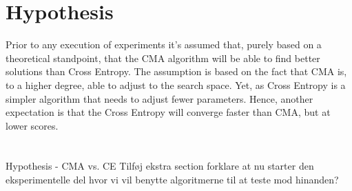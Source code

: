 \section{Hypothesis}

Prior to any execution of experiments it's assumed that, purely based 
on a theoretical standpoint, that the CMA algorithm will be able to 
find better solutions than Cross Entropy. The assumption is based 
on the fact that CMA is, to a higher degree, able to adjust to the 
search space. Yet, as Cross Entropy is a simpler algorithm that needs 
to adjust fewer parameters. Hence, another expectation is that the 
Cross Entropy will converge faster than CMA, but at lower scores.\\
\\
\\
Hypothesis - CMA vs. CE
Tilføj ekstra section forklare at nu starter 
den eksperimentelle del hvor vi vil 
benytte algoritmerne til at teste mod hinanden?
